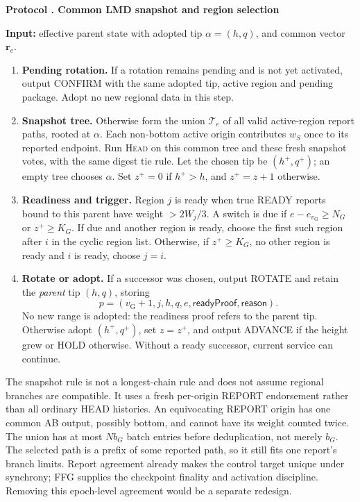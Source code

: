 \documentclass[11pt,a4paper,onecolumn]{article}
\newcommand{\gv}{v_{\mathrm G}}
\newcommand{\Proc}[1]{\textnormal{\textsc{#1}}}
\theoremstyle{remark}\newtheorem{example}[definition]{Example}
\newcounter{protocol}
\newenvironment{protocol}[2]{\refstepcounter{protocol}\label{#1}\begin{mdframed}[nobreak=true,linewidth=.6pt,skipabove=10pt,skipbelow=10pt,innertopmargin=8pt,innerbottommargin=8pt]\small\raggedright\noindent\textbf{Protocol \theprotocol. #2}\par\smallskip}{\end{mdframed}}
\begin{document}
\begin{protocol}{alg:gtransition}{Common LMD snapshot and region selection}
\textbf{Input:} effective parent state with adopted tip $\alpha=(h,q)$,
and common vector $\mathbf r_e$.
\begin{enumerate}[label=\textbf{T\arabic*.}]
\item \textbf{Pending rotation.} If a rotation remains pending and is not yet
activated, output CONFIRM with the same adopted tip, active region and pending
package. Adopt no new regional data in this step.
\item \textbf{Snapshot tree.} Otherwise form the union $\mathcal T_e$ of all
valid active-region report paths, rooted at $\alpha$. Each non-bottom active
origin contributes $w_S$ once to its reported endpoint. Run \Proc{Head} on
this common tree and these fresh snapshot votes, with the same digest tie rule.
Let the chosen tip be $(h^+,q^+)$; an empty tree chooses $\alpha$.
Set $z^+=0$ if $h^+>h$, and $z^+=z+1$ otherwise.
\item \textbf{Readiness and trigger.} Region $j$ is ready when true READY
reports bound to this parent have weight $>2W_j/3$. A switch is due if
$e-e_{\gv}\geq N_G$ or $z^+\geq K_G$. If due and another region is ready,
choose the first such region after $i$ in the cyclic region list. Otherwise,
if $z^+\geq K_G$, no other region is ready and $i$ is ready, choose $j=i$.
\item \textbf{Rotate or adopt.} If a successor was chosen, output ROTATE and
retain the \emph{parent} tip $(h,q)$, storing
\[
 p=(\gv+1,j,h,q,e,\mathsf{readyProof},\mathsf{reason}).
\]
No new range is adopted: the readiness proof refers to the parent tip.
Otherwise adopt $(h^+,q^+)$, set $z=z^+$, and output ADVANCE if the height
grew or HOLD otherwise. Without a ready successor, current service can continue.
\end{enumerate}
\end{protocol}

The snapshot rule is not a longest-chain rule and does not assume regional
branches are compatible. It uses a fresh per-origin REPORT endorsement rather
than all ordinary HEAD histories. An equivocating REPORT origin has one common
AB output, possibly bottom, and cannot have its weight counted twice.
The union has at most $Nb_G$ batch entries before deduplication, not merely
$b_G$. The selected path is a prefix of some reported path, so it still fits
one report's branch limits. Report agreement already makes the control target
unique under synchrony; FFG supplies the checkpoint finality and activation
discipline. Removing this epoch-level agreement would be a separate redesign.
\end{document}
